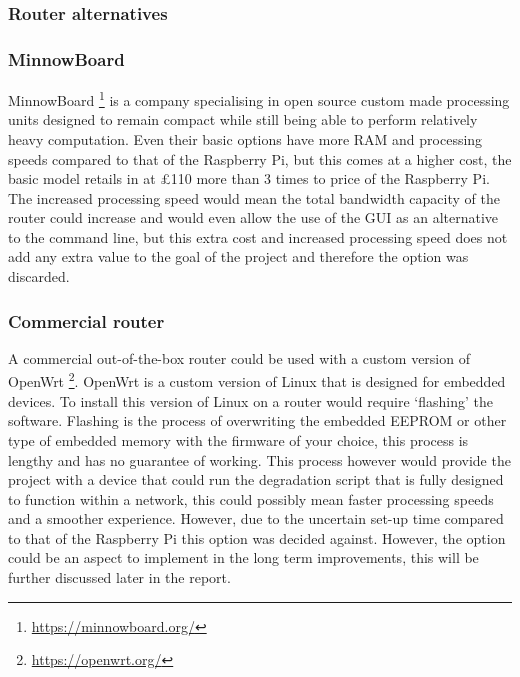 \subsubsection{Router alternatives}

\subsubsection*{MinnowBoard}
MinnowBoard \footnote{\url{https://minnowboard.org/}} is a company specialising in open source custom made processing units designed to remain compact while still being able to perform relatively heavy computation. Even their basic options have more RAM and processing speeds compared to that of the Raspberry Pi, but this comes at a higher cost, the basic model retails in at £110 more than 3 times to price of the Raspberry Pi. The increased processing speed would mean the total bandwidth capacity of the router could increase and would even allow the use of the GUI as an alternative to the command line, but this extra cost and increased processing speed does not add any extra value to the goal of the project and therefore the option was discarded.

\subsubsection*{Commercial router}
A commercial out-of-the-box router could be used with a custom version of OpenWrt \footnote{\url{https://openwrt.org/}}. OpenWrt is a custom version of Linux that is designed for embedded devices. To install this version of Linux on a router would require `flashing' the software. Flashing is the process of overwriting the embedded EEPROM or other type of embedded memory with the firmware of your choice, this process is lengthy and has no guarantee of working. This process however would provide the project with a device that could run the degradation script that is fully designed to function within a network, this could possibly mean faster processing speeds and a smoother experience. However, due to the uncertain set-up time compared to that of the Raspberry Pi this option was decided against. However, the option could be an aspect to implement in the long term improvements, this will be further discussed later in the report.


\clearpage
